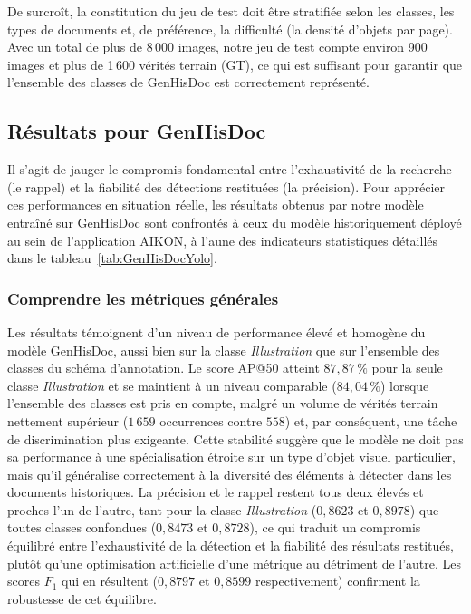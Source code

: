 De surcroît, la constitution du jeu de test doit être stratifiée selon les classes, les types de documents et, de préférence, la difficulté (la densité d'objets par page). Avec un total de plus de 8\,000 images, notre jeu de test compte environ 900 images et plus de 1\,600 vérités terrain (GT), ce qui est suffisant pour garantir que l'ensemble des classes de GenHisDoc est correctement représenté.

\subsection{Résultats pour GenHisDoc}

Il s'agit de jauger le compromis fondamental entre l'exhaustivité de la recherche (le rappel) et la fiabilité des détections restituées (la précision). Pour apprécier ces performances en situation réelle, les résultats obtenus par notre modèle entraîné sur GenHisDoc sont confrontés à ceux du modèle historiquement déployé au sein de l'application AIKON, à l'aune des indicateurs statistiques détaillés dans le tableau~\ref{tab:GenHisDocYolo}.

\subsubsection{Comprendre les métriques générales}

Les résultats témoignent d'un niveau de performance élevé et homogène du modèle GenHisDoc, aussi bien sur la classe \textit{Illustration} que sur l'ensemble des classes du schéma d'annotation. Le score AP@50 atteint $87{,}87\,\%$ pour la seule classe \textit{Illustration} et se maintient à un niveau comparable ($84{,}04\,\%$) lorsque l'ensemble des classes est pris en compte, malgré un volume de vérités terrain nettement supérieur ($1\,659$ occurrences contre $558$) et, par conséquent, une tâche de discrimination plus exigeante. Cette stabilité suggère que le modèle ne doit pas sa performance à une spécialisation étroite sur un type d'objet visuel particulier, mais qu'il généralise correctement à la diversité des éléments à détecter dans les documents historiques. La précision et le rappel restent tous deux élevés et proches l'un de l'autre, tant pour la classe \textit{Illustration} ($0{,}8623$ et $0{,}8978$) que toutes classes confondues ($0{,}8473$ et $0{,}8728$), ce qui traduit un compromis équilibré entre l'exhaustivité de la détection et la fiabilité des résultats restitués, plutôt qu'une optimisation artificielle d'une métrique au détriment de l'autre. Les scores $F_1$ qui en résultent ($0{,}8797$ et $0{,}8599$ respectivement) confirment la robustesse de cet équilibre.

